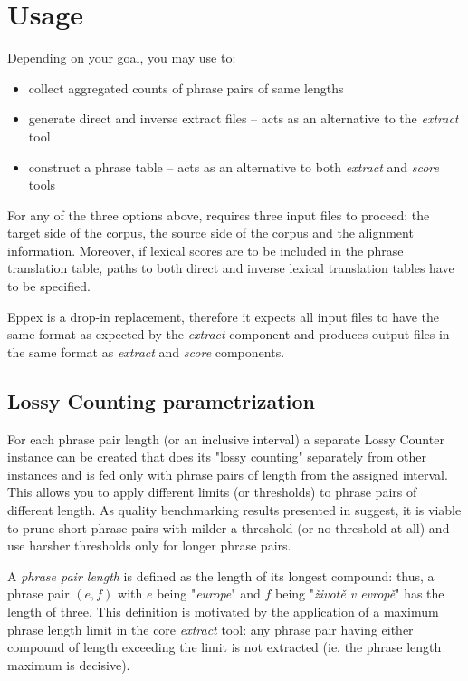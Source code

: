 
\chapter{Usage}
\label{chap:usage}

Depending on your goal, you may use \eppex{} to:
\begin{itemize}
 \item collect aggregated counts of phrase pairs of same lengths
 \item generate direct and inverse extract files -- acts as an alternative to the \emph{extract} tool
 \item construct a phrase table -- acts as an alternative to both \emph{extract} and \emph{score} tools
\end{itemize}

For any of the three options above, \eppex{} requires three input files to proceed:
the target side of the corpus, the source side of the corpus and the alignment information.
Moreover, if lexical scores are to be included in the phrase translation table,
paths to both direct and inverse lexical translation tables have to be specified.

Eppex is a drop-in replacement, therefore it expects all input files to have the same
format as expected by the \emph{extract} component and produces output files in the same
format as \emph{extract} and \emph{score} components.

\section{Lossy Counting parametrization}

For each phrase pair length (or an inclusive interval) a separate Lossy Counter
instance can be created that does its "lossy counting" separately from other instances
and is fed only with phrase pairs of length from the assigned interval.
This allows you to apply different limits (or thresholds) to phrase pairs of different length.
As quality benchmarking results presented in  suggest, it is viable
to prune short phrase pairs with milder a threshold (or no threshold at all) and use harsher
thresholds only for longer phrase pairs.

A \emph{phrase pair length} is defined as the length of its longest compound:
thus, a phrase pair $(e,f)$ with $e$ being "\emph{europe}" and $f$ being
"\emph{životě v evropě}" has the length of three.
This definition is motivated by the application of a maximum phrase length limit
in the core \emph{extract} tool: any phrase pair having either compound of length
exceeding the limit is not extracted (ie. the phrase length maximum is decisive).

